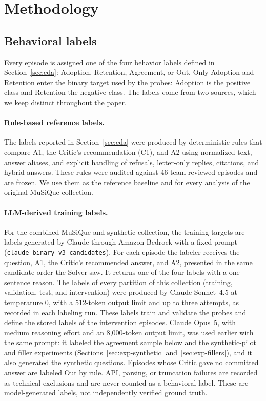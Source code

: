 \section{Methodology}
\label{sec:methodology}


\subsection{Behavioral labels}
\label{sec:method-labels}

Every episode is assigned one of the four behavior labels defined in
Section~\ref{sec:eda}: Adoption, Retention, Agreement, or Out. Only Adoption
and Retention enter the binary target used by the probes: Adoption is the
positive class and Retention the negative class. The labels come from two
sources, which we keep distinct throughout the paper.

\paragraph{Rule-based reference labels.} The labels reported in
Section~\ref{sec:eda} were produced by deterministic rules that compare A1,
the Critic's recommendation (C1), and A2 using normalized text, answer
aliases, and explicit handling of refusals, letter-only replies, citations,
and hybrid answers. These rules were audited against 46 team-reviewed
episodes and are frozen. We use them as the reference baseline and for every
analysis of the original MuSiQue collection.

\paragraph{LLM-derived training labels.} For the combined MuSiQue and
synthetic collection, the training targets are labels generated by Claude
through Amazon Bedrock with a fixed prompt
(\texttt{claude\_\allowbreak binary\_\allowbreak v3\_\allowbreak candidates}).
For each episode the labeler
receives the question, A1, the Critic's recommended answer, and A2, presented
in the same candidate order the Solver saw. It returns one of the four labels
with a one-sentence reason. The labels of every partition of this collection
(training, validation, test, and intervention) were produced by Claude
Sonnet~4.5 at temperature 0, with a 512-token output limit and up to three
attempts, as recorded in each labeling run. These labels train and validate
the probes and define the stored labels of the intervention episodes. Claude
Opus~5, with medium reasoning effort and an 8,000-token output limit, was used
earlier with the same prompt: it labeled the agreement sample below and the
synthetic-pilot and filler experiments
(Sections~\ref{sec:exp-synthetic} and~\ref{sec:exp-fillers}), and it also
generated the synthetic questions. Episodes whose Critic gave no committed answer are
labeled Out by rule. API, parsing, or truncation failures are recorded as
technical exclusions and are never counted as a behavioral label. These are
model-generated labels, not independently verified ground truth.

